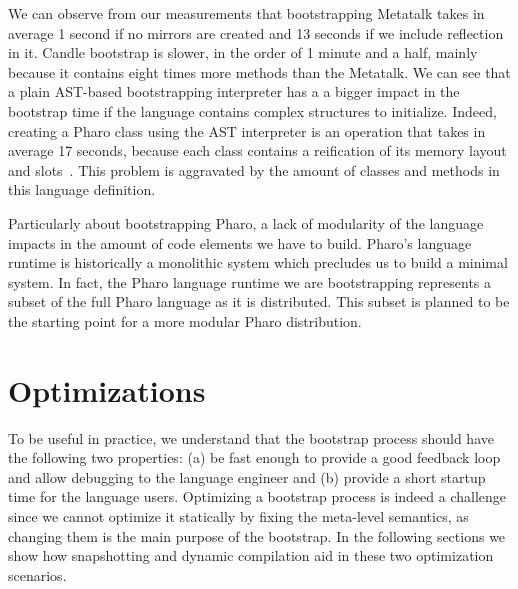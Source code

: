 We can observe from our measurements that bootstrapping Metatalk takes in average 1 second if no mirrors are created and 13 seconds if we include reflection in it. Candle bootstrap is slower, in the order of 1 minute and a half, mainly because it contains eight times more methods than the Metatalk. We can see that a plain AST-based bootstrapping interpreter has a a bigger impact in the bootstrap time if the language contains complex structures to initialize.  Indeed, creating a Pharo class using the AST interpreter is an operation that takes in average 17 seconds, because each class contains a reification of its memory layout and slots~\cite{Verw11a}. This problem is aggravated by the amount of classes and methods in this language definition.

Particularly about bootstrapping Pharo, a lack of modularity of the language impacts in the amount of code elements we have to build. Pharo's language runtime is historically a monolithic system which precludes us to build a minimal system. In fact, the Pharo language runtime we are bootstrapping represents a subset of the full Pharo language as it is distributed. This subset is planned to be the starting point for a more modular Pharo distribution.

\section{Optimizations}\label{sec:optimisations}

To be useful in practice, we understand that the bootstrap process should have the following two properties: (a) be fast enough to provide a good feedback loop and allow debugging to the language engineer and (b) provide a short startup time for the language users. Optimizing a bootstrap process is indeed a challenge since we cannot optimize it statically by fixing the meta-level semantics, as changing them is the main purpose of the bootstrap. In the following sections we show how snapshotting and dynamic compilation aid in these two optimization scenarios. 

